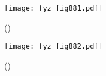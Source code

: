{    \begin{figure}[ht!] %
      \centering
      \texttt{[image: fyz\_fig881.pdf]}
      \caption{
               (\cite[s.~707]{Feynman02})}
      \label{fyz_fig881}
    \end{figure}

    \begin{figure}[ht!] %
      \centering
      \texttt{[image: fyz\_fig882.pdf]}
      \caption{
               (\cite[s.~707]{Feynman02})}
      \label{fyz_fig882}
    \end{figure}



} %
\printbibliography[title={Seznam literatury},heading=subbibliography]
